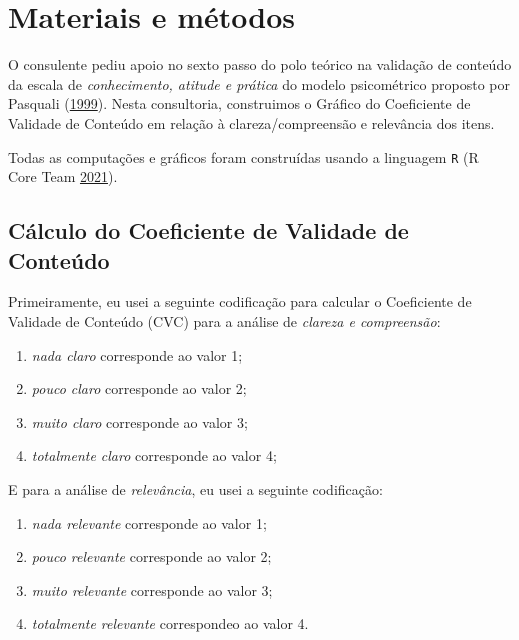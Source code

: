 \documentclass[
]{article}
\providecommand{\tightlist}{%
  \setlength{\itemsep}{0pt}\setlength{\parskip}{0pt}}
\begin{document}
\hypertarget{materiais-e-muxe9todos}{%
\section{Materiais e métodos}\label{materiais-e-muxe9todos}}

O consulente pediu apoio no sexto passo do polo teórico na validação de conteúdo da escala de \emph{conhecimento, atitude e prática } do modelo psicométrico proposto por Pasquali (\protect\hyperlink{ref-pasquali1999elaboraccao}{1999}). Nesta consultoria, construimos o Gráfico do Coeficiente de Validade de Conteúdo em relação à clareza/compreensão e relevância dos itens.

Todas as computações e gráficos foram construídas usando a linguagem \texttt{R} (R Core Team \protect\hyperlink{ref-Rlang}{2021}).

\hypertarget{cuxe1lculo-do-coeficiente-de-validade-de-conteuxfado}{%
\subsection{Cálculo do Coeficiente de Validade de Conteúdo}\label{cuxe1lculo-do-coeficiente-de-validade-de-conteuxfado}}

Primeiramente, eu usei a seguinte codificação para calcular o Coeficiente de Validade de Conteúdo (CVC) para a análise de \emph{clareza e compreensão}:

\begin{enumerate}
\def\labelenumi{\arabic{enumi}.}
\tightlist
\item
  \emph{nada claro} corresponde ao valor 1;
\item
  \emph{pouco claro} corresponde ao valor 2;
\item
  \emph{muito claro} corresponde ao valor 3;
\item
  \emph{totalmente claro} corresponde ao valor 4;
\end{enumerate}

E para a análise de \emph{relevância}, eu usei a seguinte codificação:

\begin{enumerate}
\def\labelenumi{\arabic{enumi}.}
\tightlist
\item
  \emph{nada relevante} corresponde ao valor 1;
\item
  \emph{pouco relevante} corresponde ao valor 2;
\item
  \emph{muito relevante} corresponde ao valor 3;
\item
  \emph{totalmente relevante} correspondeo ao valor 4.
\end{enumerate}
\end{document}
